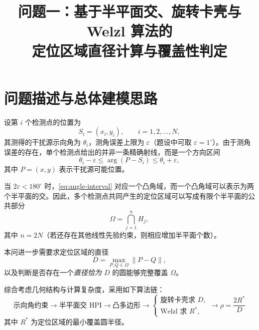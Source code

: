 \documentclass[UTF8,12pt,a4paper]{ctexart}
\title{问题一：基于半平面交、旋转卡壳与 Welzl 算法的\\定位区域直径计算与覆盖性判定}
\author{}
\date{}
\theoremstyle{definition}
\newcommand{\eps}{\varepsilon}
\newcommand{\norm}[1]{\left\lVert #1\right\rVert}
\begin{document}
\maketitle
\tableofcontents
\newpage

\section{问题描述与总体建模思路}

设第 $i$ 个检测点的位置为
\[
S_i=(x_i,y_i),\qquad i=1,2,\ldots,N,
\]
其测得的干扰源示向角为 $\theta_i$，测角误差上限为 $\eps$（题设中可取 $\eps=1^\circ$）。由于测角误差的存在，单个检测点给出的并非一条精确射线，而是一个方向区间
\begin{equation}
\theta_i-\eps\leq \arg(P-S_i)\leq \theta_i+\eps,
\label{eq:angle-interval}
\end{equation}
其中 $P=(x,y)$ 表示干扰源可能位置。

当 $2\eps<180^\circ$ 时，\cref{eq:angle-interval} 对应一个凸角域，而一个凸角域可以表示为两个半平面的交。因此，多个检测点共同产生的定位区域可以写成有限个半平面的公共部分
\begin{equation}
\Omega=\bigcap_{j=1}^{n}H_j,
\label{eq:omega-hpi}
\end{equation}
其中 $n=2N$（若还存在其他线性先验约束，则相应增加半平面个数）。

本问进一步需要求定位区域的直径
\begin{equation}
D=\max_{P,Q\in\Omega}\norm{P-Q},
\label{eq:diameter-def}
\end{equation}
以及判断是否存在一个\emph{直径恰为 $D$} 的圆能够完整覆盖 $\Omega$。

综合考虑几何结构与计算复杂度，采用如下算法链：
\begin{equation}
\boxed{
\text{示向角约束}
\longrightarrow
\text{半平面交 HPI}
\longrightarrow
\text{凸多边形}
\longrightarrow
\begin{cases}
\text{旋转卡壳求 }D,\\
\text{Welzl 求 }R^*,
\end{cases}
\longrightarrow
\rho=\dfrac{2R^*}{D}
}
\label{eq:overall-pipeline}
\end{equation}
其中 $R^*$ 为定位区域的最小覆盖圆半径。
\end{document}
